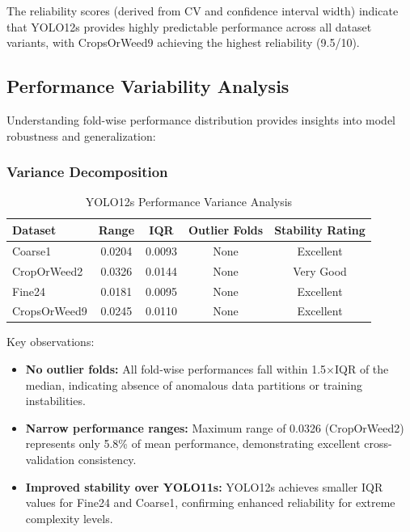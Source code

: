 The reliability scores (derived from CV and confidence interval width) indicate that YOLO12s provides highly predictable performance across all dataset variants, with CropsOrWeed9 achieving the highest reliability (9.5/10).

\subsection{Performance Variability Analysis}

Understanding fold-wise performance distribution provides insights into model robustness and generalization:

\subsubsection{Variance Decomposition}

\begin{table}[htbp]
\centering
\caption{YOLO12s Performance Variance Analysis}
\label{tab:yolo12s_variance}
\begin{tabular}{lcccc}
\toprule
\textbf{Dataset} & \textbf{Range} & \textbf{IQR} & \textbf{Outlier Folds} & \textbf{Stability Rating} \\
\midrule
Coarse1       & 0.0204 & 0.0093 & None & Excellent \\
CropOrWeed2   & 0.0326 & 0.0144 & None & Very Good \\
Fine24        & 0.0181 & 0.0095 & None & Excellent \\
CropsOrWeed9  & 0.0245 & 0.0110 & None & Excellent \\
\bottomrule
\end{tabular}
\end{table}

Key observations:
\begin{itemize}
    \item \textbf{No outlier folds:} All fold-wise performances fall within 1.5$\times$IQR of the median, indicating absence of anomalous data partitions or training instabilities.
    
    \item \textbf{Narrow performance ranges:} Maximum range of 0.0326 (CropOrWeed2) represents only 5.8\% of mean performance, demonstrating excellent cross-validation consistency.
    
    \item \textbf{Improved stability over YOLO11s:} YOLO12s achieves smaller IQR values for Fine24 and Coarse1, confirming enhanced reliability for extreme complexity levels.
\end{itemize}

